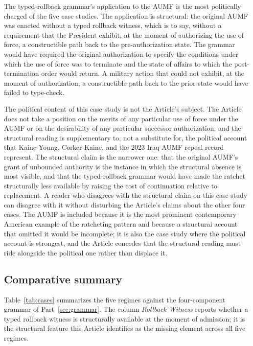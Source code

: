 The typed-rollback grammar's application to the AUMF is the most politically charged of the five case studies.
The application is structural: the original AUMF was enacted without a typed rollback witness,
which is to say, without a requirement that the President exhibit, at the moment of authorizing the use of force,
a constructible path back to the pre-authorization state.
The grammar would have required the original authorization to specify the conditions under which the use of force
was to terminate and the state of affairs to which the post-termination order would return.
A military action that could not exhibit, at the moment of authorization, a constructible path back to the prior state
would have failed to type-check.

The political content of this case study is not the Article's subject.
The Article does not take a position on the merits of any particular use of force under the AUMF or on
the desirability of any particular successor authorization, and the structural reading is supplementary
to, not a substitute for, the political account that Kaine-Young, Corker-Kaine, and the 2023 Iraq AUMF
repeal record represent.
The structural claim is the narrower one: that the original AUMF's grant of unbounded authority is the
instance in which the structural absence is most visible, and that the typed-rollback grammar would
have made the ratchet structurally less available by raising the cost of continuation relative to
replacement.
A reader who disagrees with the structural claim on this case study can disagree with it without
disturbing the Article's claims about the other four cases.
The AUMF is included because it is the most prominent contemporary American example of the ratcheting
pattern and because a structural account that omitted it would be incomplete; it is also the case study
where the political account is strongest, and the Article concedes that the structural reading must
ride alongside the political one rather than displace it.

\subsection{Comparative summary}

Table~\ref{tab:cases} summarizes the five regimes against the four-component grammar of Part~\ref{sec:grammar}. The column \emph{Rollback Witness} reports whether a typed rollback witness is structurally available at the moment of admission; it is the structural feature this Article identifies as the missing element across all five regimes.

